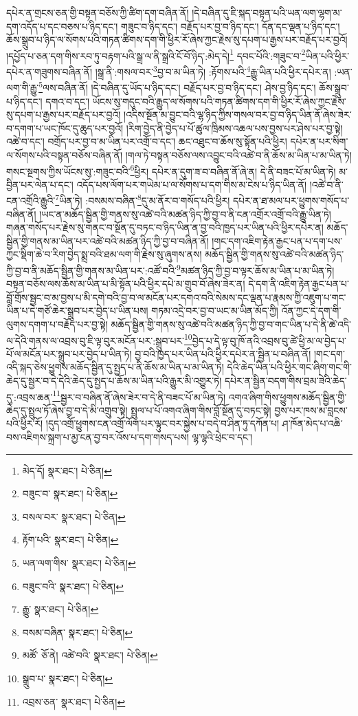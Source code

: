 དཔེར་ན་གྲངས་ཅན་གྱི་བསྟན་བཅོས་ཀྱི་ཚིག་དག་བཞིན་ནོ། །དེ་བཞིན་དུ་ཇི་སྐད་བསྟན་པའི་ཡན་ལག་ལྷག་མ་དག་འདོད་པ་དང་བཅས་པ་ཉིད་དང་། གཟུང་བ་ཉིད་དང་། བརྗོད་པར་བྱ་བ་ཉིད་དང་། དོན་དང་ལྡན་པ་ཉིད་དང་། ཆོས་སྒྲུབ་པ་ཉིད་ལ་སོགས་པའི་གཏན་ཚིགས་དག་གི་ཕྱིར་རོ་ཞེས་ཀྱང་རྗེས་སུ་དཔག་པ་རྒྱས་པར་བརྗོད་པར་བྱའོ། །དཔྱོད་པ་ཅན་དག་གིས་རབ་ཏུ་བརྟག་པའི་སྒྲ་ལ་ནི་སྒྲའི་ངོ་བོ་ཉིད་:མེད་དེ།\footnote{མེད་དོ།  སྣར་ཐང་།  པེ་ཅིན། } དབང་པོའི་:གཟུང་བ་\footnote{བཟུང་བ་  སྣར་ཐང་།  པེ་ཅིན། }ཡིན་པའི་ཕྱིར་དཔེར་ན་གཟུགས་བཞིན་ནོ། །སྒྲ་ནི་:གསལ་བར་\footnote{བསལ་བར་  སྣར་ཐང་།  པེ་ཅིན། }བྱ་བ་མ་ཡིན་ཏེ། :རྟོགས་པའི་\footnote{རྟོག་པའི་  སྣར་ཐང་།  པེ་ཅིན། }རྒྱུ་ཡིན་པའི་ཕྱིར་དཔེར་ན། :ཡན་ལག་གི་རྒྱུ་\footnote{ཡན་ལག་གིས་  སྣར་ཐང་།  པེ་ཅིན། }ལས་བཞིན་ནོ། །དེ་བཞིན་དུ་ཡོད་པ་ཉིད་དང་། བརྗོད་པར་བྱ་བ་ཉིད་དང་། ཤེས་བྱ་ཉིད་དང་། ཆོས་སྒྲུབ་པ་ཉིད་དང་། དགའ་བ་དང་། ཡོངས་སུ་གདུང་བའི་རྒྱུད་ལ་སོགས་པའི་གཏན་ཚིགས་དག་གི་ཕྱིར་རོ་ཞེས་ཀྱང་རྗེས་སུ་དཔག་པ་རྒྱས་པར་བརྗོད་པར་བྱའོ། །འདིས་སྔོན་མ་བྱུང་བའི་ལྷ་ཉིད་ཀྱིས་གསལ་བར་བྱ་བ་ཉིད་ཡིན་ནོ་ཞེས་ཟེར་བ་དགག་པ་ཡང་ཁོང་དུ་ཆུད་པར་བྱའོ། །རིག་བྱེད་ནི་བྱེད་པ་པོ་ཚུལ་ཁྲིམས་འཆལ་པས་བྱས་པར་ཤེས་པར་བྱ་སྟེ། འཚེ་བ་དང་། བགྲོད་པར་བྱ་བ་མ་ཡིན་པར་འགྲོ་བ་དང་། ཆང་འཐུང་བ་ཆོས་སུ་སྟོན་པའི་ཕྱིར། དཔེར་ན་པར་སིག་ལ་སོགས་པའི་བསྟན་བཅོས་བཞིན་ནོ། །གལ་ཏེ་བསྟན་བཅོས་ལས་འབྱུང་བའི་འཚེ་བ་ནི་ཆོས་མ་ཡིན་པ་མ་ཡིན་ཏེ། གསང་སྔགས་ཀྱིས་ཡོངས་སུ་:གཟུང་བའི་\footnote{བཟུང་བའི་  སྣར་ཐང་།  པེ་ཅིན། }ཕྱིར། དཔེར་ན་དུག་ཟ་བ་བཞིན་ནོ་ཞེ་ན། དེ་ནི་བཟང་པོ་མ་ཡིན་ཏེ། མ་བྱིན་པར་ལེན་པ་དང་། འདོད་པས་ལོག་པར་གཡེམ་པ་ལ་སོགས་པ་དག་གིས་མ་ངེས་པ་ཉིད་ཡིན་ནོ། །འཚེ་བ་ནི་ངན་འགྲོའི་རྒྱུའི་\footnote{རྒྱུ་  སྣར་ཐང་།  པེ་ཅིན། }ཡིན་ཏེ། :བསམས་བཞིན་\footnote{བསམ་བཞིན་  སྣར་ཐང་།  པེ་ཅིན། }དུ་མ་ནོར་བ་གསོད་པའི་ཕྱིར། དཔེར་ན་ཐ་མལ་པར་ཕྱུགས་གསོད་པ་བཞིན་ནོ། །ཡང་ན་མཆོད་སྦྱིན་གྱི་གནས་སུ་འཚེ་བའི་མཚན་ཉིད་ཀྱི་བྱ་བ་ནི་ངན་འགྲོར་འགྲོ་བའི་རྒྱུ་ཡིན་ཏེ། གཞན་གསོད་པར་རྗེས་སུ་གནང་བ་སྔོན་དུ་བཏང་བ་ཉིད་ཡིན་ན་བྱ་བའི་ཁྱད་པར་ཡིན་པའི་ཕྱིར་དཔེར་ན། མཆོད་སྦྱིན་གྱི་གནས་མ་ཡིན་པར་འཚེ་བའི་མཚན་ཉིད་ཀྱི་བྱ་བ་བཞིན་ནོ། །གང་དག་འཇིག་རྟེན་རྒྱང་པན་པ་དག་པས་ཀྱང་སྡིག་ཆེ་བ་རིག་བྱེད་སྨྲ་བའི་ཐམ་ལག་གི་རྗེས་སུ་ཞུགས་ནས། མཆོད་སྦྱིན་གྱི་གནས་སུ་འཚེ་བའི་མཚན་ཉིད་ཀྱི་བྱ་བ་ནི་མཆོད་སྦྱིན་གྱི་གནས་མ་ཡིན་པར་:འཚོ་བའི་\footnote{མཚོ་  ཅོ་ནེ། འཚེ་བའི་  སྣར་ཐང་།  པེ་ཅིན། }མཚན་ཉིད་ཀྱི་བྱ་བ་ལྟར་ཆོས་མ་ཡིན་པ་མ་ཡིན་ཏེ། བསྟན་བཅོས་ལས་ཆོས་མ་ཡིན་པ་མི་སྟོན་པའི་ཕྱིར་དཔེ་མ་གྲུབ་བོ་ཞེས་ཟེར་ན། དེ་དག་ནི་འཇིག་རྟེན་རྒྱང་པན་པ་བློ་གྲོས་སྦྱང་བ་མ་བྱས་པ་མི་དགེ་བའི་བྱ་བ་ལ་མངོན་པར་དགའ་བའི་སེམས་དང་ལྡན་པ་རྣམས་ཀྱི་འཇུག་པ་གང་ཡིན་པ་དེ་གཙོ་ཆེར་སྒྲུབ་པར་བྱེད་པ་ཡིན་པས། གཏམ་འདྲེ་བར་བྱ་བ་ཡང་མ་ཡིན་མོད་ཀྱི། འོན་ཀྱང་དེ་དག་གི་ལུགས་དགག་པ་བརྗོད་པར་བྱ་སྟེ། མཆོད་སྦྱིན་གྱི་གནས་སུ་འཚེ་བའི་མཚན་ཉིད་ཀྱི་བྱ་བ་གང་ཡིན་པ་དེ་ནི་ཚེ་འདི་ལ་དེའི་གནས་ལ་འབྲས་བུ་ཇི་ལྟ་བུར་མངོན་པར་:སྒྲུབ་པར་\footnote{སྒྲུབ་པ་  སྣར་ཐང་།  པེ་ཅིན། }བྱེད་པ་དེ་ལྟ་བུ་ཁོ་ནའི་འབྲས་བུ་ཚེ་ཕྱི་མ་ལ་བྱེད་པ་པོ་ལ་མངོན་པར་སྒྲུབ་པར་བྱེད་པ་ཡིན་ཏེ། བྱ་བའི་ཁྱད་པར་ཡིན་པའི་ཕྱིར་དཔེར་ན་སྦྱིན་པ་བཞིན་ནོ། །གང་དག་འདི་སྐད་ཅེས་ཕྱུགས་མཆོད་སྦྱིན་དུ་སྤྱད་པ་ནི་ཆོས་མ་ཡིན་པ་མ་ཡིན་ཏེ། དེའི་ཆེད་ཡིན་པའི་ཕྱིར་གང་ཞིག་གང་གི་ཆེད་དུ་སྦྱར་བ་དེ་དེའི་ཆེད་དུ་སྤྱད་པ་ཆོས་མ་ཡིན་པའི་རྒྱུར་མི་འགྱུར་ཏེ། དཔེར་ན་སྦྱིན་བདག་གིས་བྲམ་ཟེའི་ཆེད་དུ་:འབྲས་ཆན་\footnote{འབྲས་ཅན་  སྣར་ཐང་།  པེ་ཅིན། }སྦྱར་བ་བཞིན་ནོ་ཞེས་ཟེར་བ་དེ་ནི་བཟང་པོ་མ་ཡིན་ཏེ། འགའ་ཞིག་གིས་ཕྱུགས་མཆོད་སྦྱིན་གྱི་ཆེད་དུ་སྤྲུལ་ཏོ་ཞེས་བྱ་བ་དེ་མི་འགྲུབ་སྟེ། སྤྲུལ་པ་པོ་འགའ་ཞིག་གིས་བློ་སྔོན་དུ་བཏང་སྟེ། བྱས་པར་ཁས་མ་བླངས་པའི་ཕྱིར་རོ། །དུད་འགྲོ་ཕྱུགས་ངན་འགྲོ་ལོག་པར་ལྟུང་བར་སྐྱེས་པ་བདེ་བ་ཤིན་ཏུ་དཀོན་པ། ཤ་ཁོན་མེད་པ་འཆི་བས་འཇིགས་སྐྲག་པ་མྱ་ངན་བྱ་བར་འོས་པ་དག་གསད་པས། ལྷ་ལྷའི་ཕྲེང་བ་དང་། 